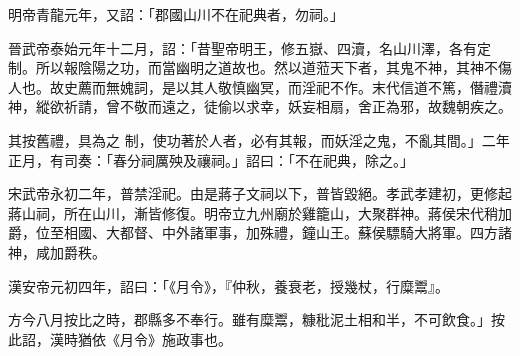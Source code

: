 \begin{pinyinscope}
 明帝青龍元年，又詔：「郡國山川不在祀典者，勿祠。」



 晉武帝泰始元年十二月，詔：「昔聖帝明王，修五嶽、四瀆，名山川澤，各有定制。所以報陰陽之功，而當幽明之道故也。然以道蒞天下者，其鬼不神，其神不傷人也。故史薦而無媿詞，是以其人敬慎幽冥，而淫祀不作。末代信道不篤，僭禮瀆神，縱欲祈請，曾不敬而遠之，徒偷以求幸，妖妄相扇，舍正為邪，故魏朝疾之。



 其按舊禮，具為之
 制，使功著於人者，必有其報，而妖淫之鬼，不亂其間。」二年正月，有司奏：「春分祠厲殃及禳祠。」詔曰：「不在祀典，除之。」



 宋武帝永初二年，普禁淫祀。由是蔣子文祠以下，普皆毀絕。孝武孝建初，更修起蔣山祠，所在山川，漸皆修復。明帝立九州廟於雞籠山，大聚群神。蔣侯宋代稍加爵，位至相國、大都督、中外諸軍事，加殊禮，鐘山王。蘇侯驃騎大將軍。四方諸神，咸加爵秩。



 漢安帝元初四年，詔曰：「《月令》，『仲秋，養衰老，授幾杖，行糜鬻』。



 方今八月按比之時，郡縣多不奉行。雖有糜鬻，糠秕泥土相和半，不可飲食。」按此詔，漢時猶依《月令》施政事也。



\end{pinyinscope}